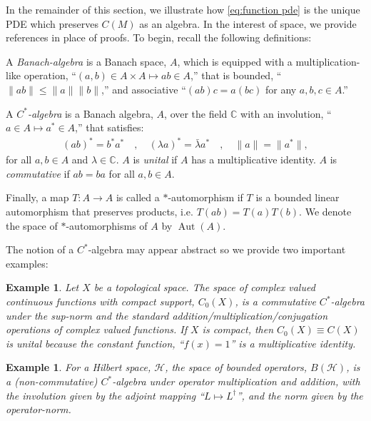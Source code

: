 \documentclass[final,leqno]{siamart}
\newtheorem{example}[theorem]{Example}
\begin{document}
In the remainder of this section, we illustrate how \eqref{eq:function pde} is the unique PDE which preserves $C(M)$ as an algebra.
In the interest of space, we provide references in place of proofs.
To begin, recall the following definitions:
\begin{definition} \label{def:algebra}
	A \emph{Banach-algebra} is a Banach space, $A$, which is equipped with a multiplication-like operation, ``$(a,b) \in A \times A \mapsto ab \in A$,''  that is bounded, ``$\| ab \| \leq \|a \| \|b \|$,'' and associative ``$(ab)c = a(bc)$ for any $a,b,c \in A$.''
	
	A \emph{$C^{*}$-algebra} is a Banach algebra, $A$, over the field $\mathbb{C}$ with an involution, ``$a \in A \mapsto a^{*} \in A$,'' that satisfies:
	\begin{align}
		(ab)^{*} = b^{*} a^{*} \quad,\quad
		(\lambda a)^{*} = \bar{\lambda} a^{*} \quad,\quad
		\| a \| = \| a^{*}\|,
	\end{align}
	for all $a,b \in A$ and $\lambda \in \mathbb{C}$.
	$A$ is \emph{unital} if $A$ has a multiplicative identity.
	$A$ is \emph{commutative} if $ab = ba$ for all $a,b \in A$.
	
	Finally, a map $T:A \to A$ is called a $*$-automorphism if $T$ is a bounded linear automorphism that preserves products, i.e. $T(ab) = T(a) T(b)$.
	We denote the space of $*$-automorphisms of $A$ by $\operatorname{Aut}(A)$.
\end{definition}

The notion of a $C^{*}$-algebra may appear abstract so we provide two important examples:
\begin{example} \label{ex:function algebra}
	Let $X$ be a topological space.
	The space of complex valued continuous functions with compact support, $C_{0}(X)$, is a commutative $C^{*}$-algebra under the sup-norm and the standard addition/multiplication/conjugation operations of complex valued functions.
	If $X$ is compact, then $C_{0}(X) \equiv C(X)$ is unital because the constant function, ``$f(x) = 1$'' is a multiplicative identity.
\end{example}

\begin{example} \label{ex:nc algebra} 
	For a Hilbert space, $\mathcal{H}$, the space of bounded operators, $B(\mathcal{H})$, is a (non-commutative) $C^{*}$-algebra	under operator multiplication and addition, with the involution given by the adjoint mapping ``$L \mapsto L^{\dagger}$'', and the norm given by the operator-norm.
\end{example}
\end{document}
